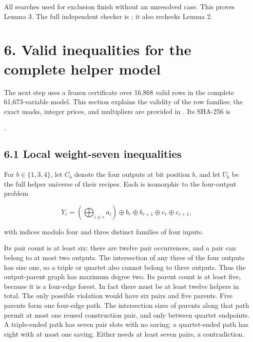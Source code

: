 All searches used for exclusion finish without an unresolved case. This proves Lemma 3. The full independent checker is \texttt{}; it also rechecks Lemma 2.

\hypertarget{valid-inequalities-for-the-complete-helper-model}{%
\section{6. Valid inequalities for the complete helper model}\label{valid-inequalities-for-the-complete-helper-model}}

The next step uses a frozen certificate over 16,868 valid rows in the complete 61,673-variable model. This section explains the validity of the row families; the exact masks, integer prices, and multipliers are provided in \texttt{}. Its SHA-256 is

\texttt{}.

\hypertarget{local-weight-seven-inequalities}{%
\subsection{6.1 Local weight-seven inequalities}\label{local-weight-seven-inequalities}}

For \(b\in\{1,3,4\}\), let \(C_b\) denote the four outputs at bit position \(b\), and let \(U_b\) be the full helper universe of their recipes. Each is isomorphic to the four-output problem

\[Y_r=\left(\bigoplus_{i\ne r}a_i\right)\oplus b_r\oplus b_{r+1}\oplus c_r\oplus c_{r+1},\]

with indices modulo four and three distinct families of four inputs.

Its pair count is at least six: there are twelve pair occurrences, and a pair can belong to at most two outputs. The intersection of any three of the four outputs has size one, so a triple or quartet also cannot belong to three outputs. Thus the output-parent graph has maximum degree two. Its parent count is at least five, because it is a four-edge forest. In fact there must be at least twelve helpers in total. The only possible violation would have six pairs and five parents. Five parents form one four-edge path. The intersection sizes of parents along that path permit at most one reused construction pair, and only between quartet endpoints. A triple-ended path has seven pair slots with no saving; a quartet-ended path has eight with at most one saving. Either needs at least seven pairs, a contradiction.

